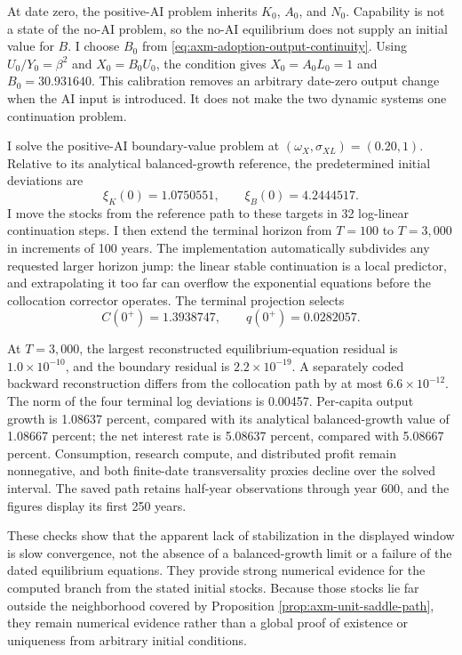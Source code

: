 At date zero, the positive-AI problem inherits \(K_0\), \(A_0\), and \(N_0\).
Capability is not a state of the no-AI problem, so the no-AI equilibrium does
not supply an initial value for \(B\). I choose \(B_0\) from
\eqref{eq:axm-adoption-output-continuity}. Using
\(U_0/Y_0=\beta^2\) and \(X_0=B_0U_0\), the condition gives
\(X_0=A_0L_0=1\) and \(B_0=30.931640\). This calibration removes an
arbitrary date-zero output change when the AI input is introduced. It does not
make the two dynamic systems one continuation problem.

I solve the positive-AI boundary-value problem at
\((\omega_X,\sigma_{XL})=(0.20,1)\). Relative to its analytical
balanced-growth reference, the predetermined initial deviations are
\[
 \xi_K(0)=1.0750551,\qquad \xi_B(0)=4.2444517.
\]
I move the stocks from the reference path to these targets in 32 log-linear
continuation steps. I then extend the terminal horizon from \(T=100\) to
\(T=3{,}000\) in increments of 100 years. The implementation automatically
subdivides any requested larger horizon jump: the linear stable continuation is a local
predictor, and extrapolating it too far can overflow the exponential equations
before the collocation corrector operates. The terminal projection selects
\[
 C(0^+)=1.3938747,\qquad q(0^+)=0.0282057.
\]

At \(T=3{,}000\), the largest reconstructed equilibrium-equation residual is
\(1.0\times10^{-10}\), and the boundary residual is
\(2.2\times10^{-19}\). A separately coded backward reconstruction differs
from the collocation path by at most \(6.6\times10^{-12}\). The norm of the
four terminal log deviations is 0.00457. Per-capita output growth is 1.08637
percent, compared with its analytical balanced-growth value of 1.08667
percent; the net interest rate is 5.08637 percent, compared with 5.08667
percent. Consumption, research compute, and distributed profit remain
nonnegative, and both finite-date transversality proxies decline over the
solved interval. The saved path retains half-year observations through year
600, and the figures display its first 250 years.

These checks show that the apparent lack of stabilization in the displayed
window is slow convergence, not the absence of a balanced-growth limit or a
failure of the dated equilibrium equations. They provide strong numerical
evidence for the computed branch from the stated initial stocks. Because those
stocks lie far outside the neighborhood covered by Proposition
\ref{prop:axm-unit-saddle-path}, they remain numerical evidence rather than a
global proof of existence or uniqueness from arbitrary initial conditions.

